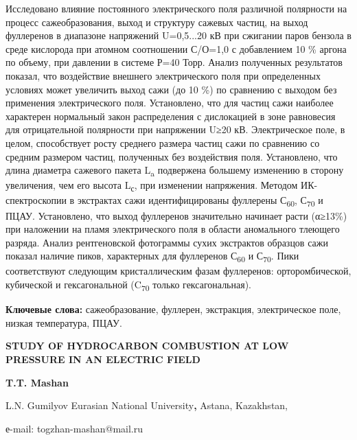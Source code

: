 Исследовано влияние постоянного электрического поля различной полярности
на процесс сажеобразования, выход и структуру сажевых частиц, на выход
фуллеренов в диапазоне напряжений U=0,5...20 кВ при сжигании паров
бензола в среде кислорода при атомном соотношении С/О=1,0 с добавлением
10 \% аргона по объему, при давлении в системе Р=40 Торр. Анализ
полученных результатов показал, что воздействие внешнего электрического
поля при определенных условиях может увеличить выход сажи (до 10 \%) по
сравнению с выходом без применения электрического поля. Установлено, что
для частиц сажи наиболее характерен нормальный закон распределения с
дислокацией в зоне равновесия для отрицательной полярности при
напряжении U≥20 кВ. Электрическое поле, в целом, способствует росту
среднего размера частиц сажи по сравнению со средним размером частиц,
полученных без воздействия поля. Установлено, что длина диаметра
сажевого пакета L\textsubscript{a} подвержена большему изменению в
сторону увеличения, чем его высота L\textsubscript{с}, при изменении
напряжения. Методом ИК-спектроскопии в экстрактах сажи идентифицированы
фуллерены С\textsubscript{60}, С\textsubscript{70} и ПЦАУ. Установлено,
что выход фуллеренов значительно начинает расти (α≥13\%) при наложении
на пламя электрического поля в области аномального тлеющего разряда.
Анализ рентгеновской фотограммы сухих экстрактов образцов сажи показал
наличие пиков, характерных для фуллеренов С\textsubscript{60} и
С\textsubscript{70}. Пики соответствуют следующим кристаллическим фазам
фуллеренов: орторомбической, кубической и гексагональной
(C\textsubscript{70} только гексагональная).

{\bfseries Ключевые слова:} сажеобразование, фуллерен, экстракция,
электрическое поле, низкая температура, ПЦАУ.

\begin{center}
{\large\bfseries STUDY OF HYDROCARBON COMBUSTION AT LOW PRESSURE IN AN ELECTRIC FIELD}

{\bfseries T.T. Mashan}

L.N. Gumilyov Eurasian National University{\bfseries ,} Astana, Kazakhstan,

е-mail: togzhan-mashan@mail.ru
\end{center}

